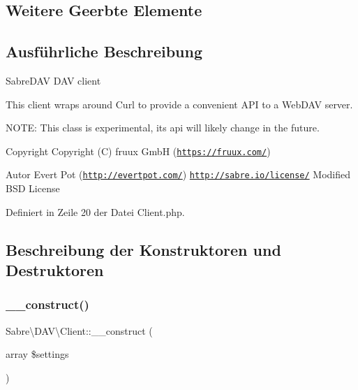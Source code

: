 \subsection*{Weitere Geerbte Elemente}


\subsection{Ausführliche Beschreibung}
Sabre\+D\+AV D\+AV client

This client wraps around Curl to provide a convenient A\+PI to a Web\+D\+AV server.

N\+O\+TE\+: This class is experimental, it\textquotesingle{}s api will likely change in the future.

\begin{DoxyCopyright}{Copyright}
Copyright (C) fruux GmbH (\href{https://fruux.com/}{\tt https\+://fruux.\+com/}) 
\end{DoxyCopyright}
\begin{DoxyAuthor}{Autor}
Evert Pot (\href{http://evertpot.com/}{\tt http\+://evertpot.\+com/})  \href{http://sabre.io/license/}{\tt http\+://sabre.\+io/license/} Modified B\+SD License 
\end{DoxyAuthor}


Definiert in Zeile 20 der Datei Client.\+php.



\subsection{Beschreibung der Konstruktoren und Destruktoren}
\mbox{\label{class_sabre_1_1_d_a_v_1_1_client_ad58bff2d9312f25d4c543e60dcad72b6}} 
\subsubsection{\texorpdfstring{\+\_\+\+\_\+construct()}{\_\_construct()}}
{\footnotesize\ttfamily Sabre\textbackslash{}\+D\+A\+V\textbackslash{}\+Client\+::\+\_\+\+\_\+construct (\begin{DoxyParamCaption}\item[{array}]{\$settings }\end{DoxyParamCaption})}

